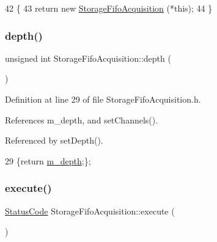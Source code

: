 \begin{DoxyCode}
42                                  \{
43     \textcolor{keywordflow}{return} \textcolor{keyword}{new} \hyperlink{classStorageFifoAcquisition_a32975d5adfb2fbeeaf18b50be5fb58fe}{StorageFifoAcquisition} (*\textcolor{keyword}{this});
44   \}
\end{DoxyCode}
\mbox{\label{classStorageFifoAcquisition_a2d549502ced65dc2e02500d2216ad23b}} 
\subsubsection{\texorpdfstring{depth()}{depth()}}
{\footnotesize\ttfamily unsigned int Storage\+Fifo\+Acquisition\+::depth (\begin{DoxyParamCaption}{ }\end{DoxyParamCaption})\hspace{0.3cm}{\ttfamily [inline]}}



Definition at line 29 of file Storage\+Fifo\+Acquisition.\+h.



References m\+\_\+depth, and set\+Channels().



Referenced by set\+Depth().


\begin{DoxyCode}
29 \{\textcolor{keywordflow}{return} \hyperlink{classStorageFifoAcquisition_a6bebf76cce0ccaae599c844a69ebd19d}{m\_depth};\};
\end{DoxyCode}
\mbox{\label{classStorageFifoAcquisition_a36ffcd2b9bd7ff721c4d0b638b8e4901}} 
\subsubsection{\texorpdfstring{execute()}{execute()}}
{\footnotesize\ttfamily \hyperlink{classStatusCode}{Status\+Code} Storage\+Fifo\+Acquisition\+::execute (\begin{DoxyParamCaption}{ }\end{DoxyParamCaption})\hspace{0.3cm}{\ttfamily [virtual]}}

